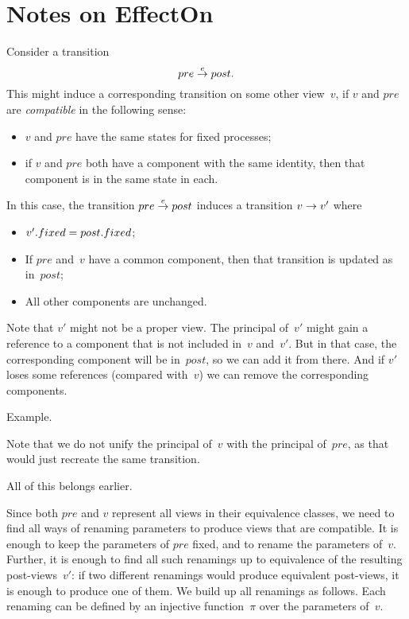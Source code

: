 \section{Notes on EffectOn}

Consider a transition
\[
pre \stackrel{e}\rightarrow post.
\]
This might induce a corresponding transition on some other view~$v$, if $v$
and $pre$ are \emph{compatible} in the following sense:
%
\begin{itemize}
\item $v$ and $pre$ have the same states for fixed processes;

\item if $v$ and $pre$ both have a component with the same identity, then that
component is in the same state in each.
\end{itemize}
%
In this case, the transition $pre \stackrel{e}\rightarrow post$ induces a transition
$v \stackrel{}\rightarrow v'$ where
%
\begin{itemize}
\item $v'.fixed = post.fixed$;

\item If $pre$ and~$v$ have a common component, then that transition is
updated as in~$post$;

\item All other components are unchanged. 
\end{itemize}
%
Note that $v'$ might not be a proper view.  The principal of~$v'$ might gain a
reference to a component that is not included in~$v$ and~$v'$.  But in that
case, the corresponding component will be in~$post$, so we can add it from
there.  And if $v'$ loses some references (compared with~$v$) we can remove
the corresponding components.


Example.

Note that we do not unify the principal of~$v$ with the principal of~$pre$, as
that would just recreate the same transition. 

All of this belongs earlier.


Since both $pre$ and $v$ represent all views in their equivalence classes, we
need to find all ways of renaming parameters to produce views that are
compatible.  It is enough to keep the parameters of $pre$ fixed, and to rename
the parameters of~$v$.  Further, it is enough to find all such renamings up to
equivalence of the resulting post-views~$v'$: if two different renamings would
produce equivalent post-views, it is enough to produce one of them.  We build
up all renamings as follows.  Each renaming can be defined by an injective
function~$\pi$ over the parameters of~$v$.

